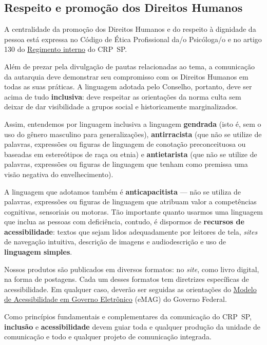 \subsection{Respeito e promoção dos Direitos Humanos}

A centralidade da promoção dos Direitos Humanos e do respeito à dignidade da pessoa está expressa no Código de Ética Profissional da/o Psicóloga/o e no artigo 130 do
\href{https://correio.crpsp.org.br/service/home/~/?auth=co&loc=pt_BR&id=4201&part=6}{{Regimento interno}} do CRP~SP.

Além de prezar pela divulgação de pautas relacionadas ao tema, a comunicação da autarquia deve demonstrar seu compromisso com os Direitos
Humanos em todas as suas práticas. A linguagem adotada pelo Conselho, portanto, deve ser acima de tudo \textbf{inclusiva}: deve
respeitar as orientações da norma culta sem deixar de dar visibilidade a grupos social e historicamente marginalizados.

Assim, entendemos por linguagem inclusiva a linguagem \textbf{gendrada} (isto é, sem o uso do gênero masculino para generalizações),
\textbf{antirracista} (que não se utilize de palavras, expressões ou figuras de linguagem de conotação preconceituosa ou baseadas em
estereótipos de raça ou etnia) e \textbf{antietarista} (que não se utilize de palavras, expressões ou figuras de linguagem que tenham como
premissa uma visão negativa do envelhecimento).

A linguagem que adotamos também é \textbf{anticapacitista} --- não se utiliza de palavras, expressões ou figuras de linguagem que atribuam
valor a competências cognitivas, sensoriais ou motoras. Tão importante quanto usarmos uma linguagem que inclua as pessoas com deficiência,
contudo, é dispormos de \textbf{recursos de acessibilidade}: textos que sejam lidos adequadamente por leitores de tela, \emph{sites} de
navegação intuitiva, descrição de imagens e audiodescrição e uso de \textbf{linguagem simples}.

Nossos produtos são publicados em diversos formatos: no \emph{site}, como livro digital, na forma de postagens. Cada um desses formatos tem
diretrizes específicas de acessibilidade. Em qualquer caso, deverão ser seguidas as orientações do \href{https://emag.governoeletronico.gov.br/}{{Modelo de
				Acessibilidade em Governo Eletrônico}} (eMAG) do Governo Federal.

Como princípios fundamentais e complementares da comunicação do CRP~SP, \textbf{inclusão} e \textbf{acessibilidade} devem guiar toda e qualquer
produção da unidade de comunicação e todo e qualquer projeto de comunicação integrada.

